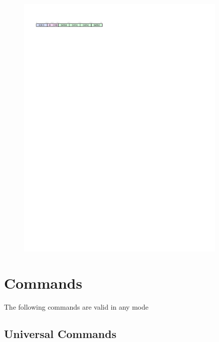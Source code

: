 \begin{figure}[h!]
\includegraphics[width=4in]{rxpacket.svg}
\end{figure}

\section{Commands}

The following commands are valid in any mode

\subsection{Universal Commands}

